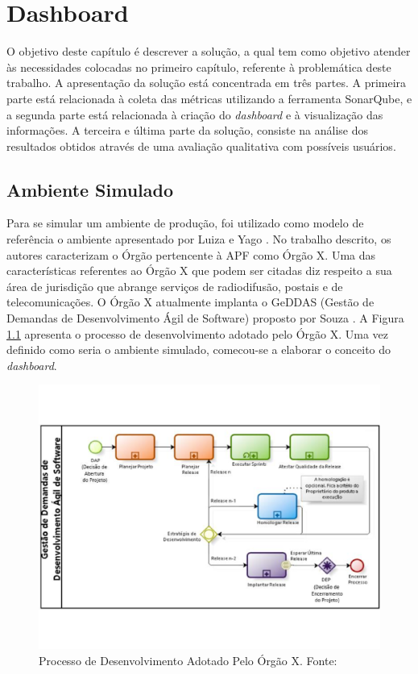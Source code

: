 \chapter[Dashboard]{Dashboard}
O objetivo deste capítulo é descrever a solução, a qual tem como objetivo atender às necessidades colocadas no primeiro capítulo, referente à problemática deste trabalho. A apresentação da solução está concentrada em três partes. A primeira parte está relacionada à coleta das métricas utilizando a ferramenta SonarQube, e a segunda parte está relacionada à criação do \textit{dashboard} e à visualização das informações. A terceira e última parte da solução, consiste na análise dos resultados obtidos através de uma avaliação qualitativa com possíveis usuários.

\section{Ambiente Simulado}
Para se simular um ambiente de produção, foi utilizado como modelo de referência o ambiente apresentado por Luiza e Yago \cite{luiza_yago}. No trabalho descrito, os autores caracterizam o Órgão pertencente à APF como Órgão X. Uma das características referentes ao Órgão X que podem ser citadas diz respeito a sua área de jurisdição que abrange serviços de radiodifusão, postais e de telecomunicações. O Órgão X atualmente implanta o GeDDAS (Gestão de Demandas de Desenvolvimento Ágil de Software) proposto por Souza \cite{souza_sobrinho_uso_2014}. A Figura \ref{img:proc_des} apresenta o processo de desenvolvimento adotado pelo Órgão X. Uma vez definido como seria o ambiente simulado, comecou-se a elaborar o conceito do \textit{dashboard}.

\graphicspath{{figuras/}}
\begin{figure}[h!]
\centering
\includegraphics[scale=0.60]{Proc_des.pdf}
\caption{Processo de Desenvolvimento Adotado Pelo Órgão X. Fonte: \cite{luiza_yago}}
\label{img:proc_des}
\end{figure}

